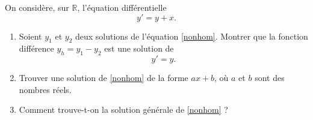 
\begin{exercice}\label{exostarterST-0021}


On considère, sur $\mathbb{R}$, l'équation différentielle
\begin{equation}\label{nonhom}
  y'=y+x.
\end{equation}
  \begin{enumerate}
  \item Soient $y_1$ et $y_2$ deux solutions de l'équation \eqref{nonhom}. Montrer que la fonction différence $y_h= y_1-y_2$ est une solution de 
    \begin{equation}
      y'=y.
    \end{equation}

  \item Trouver une solution de \eqref{nonhom} de la forme $ax+b$, où $a$ et $b$ sont des nombres réels.

  \item Comment trouve-t-on la solution générale de \eqref{nonhom} ?
  \end{enumerate}

\end{exercice}
